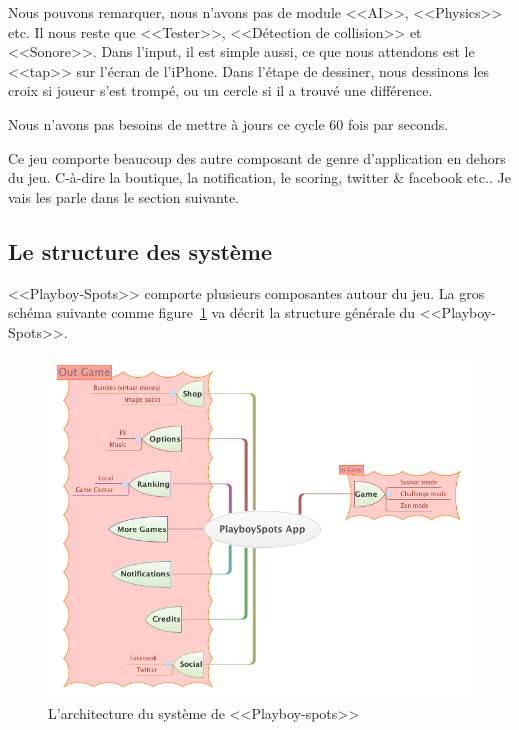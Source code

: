 Nous pouvons remarquer, nous n'avons pas de module <<AI>>, <<Physics>> etc. Il nous reste que <<Tester>>, <<Détection de collision>> et <<Sonore>>. Dans l'input, il est simple aussi, ce que nous attendons est le <<tap>> sur l'écran de l'iPhone. Dans l'étape de dessiner, nous dessinons les croix si joueur s'est trompé, ou un cercle si il a trouvé une différence.

Nous n'avons pas besoins de mettre à jours ce cycle 60 fois par seconds. 

Ce jeu comporte beaucoup des autre composant de genre d'application en dehors du jeu. C-à-dire la boutique, la notification, le scoring, twitter \& facebook etc..
Je vais les parle dans le section suivante.


\subsection{Le structure des système} %

<<Playboy-Spots>> comporte plusieurs composantes autour du jeu. La gros schéma suivante comme figure~\ref{fig:XMinds_PlayboySpotsApp} va décrit la structure générale du <<Playboy-Spots>>.
\begin{figure}[htbp]
	\centering
		\includegraphics[width=6in]{XMinds/PlayboySpotsApp.png}
	\caption{L'architecture du système de <<Playboy-spots>>}
	\label{fig:XMinds_PlayboySpotsApp}
\end{figure}



